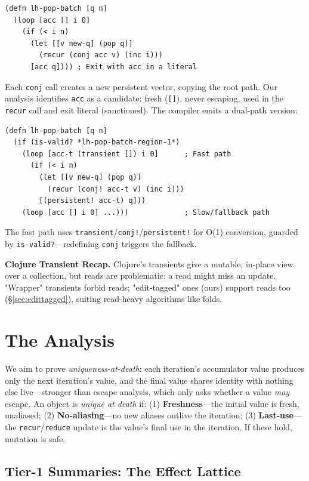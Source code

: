 \documentclass[sigplan,review,anonymous]{acmart}
\begin{document}
\begin{lstlisting}
(defn lh-pop-batch [q n]
  (loop [acc [] i 0]
    (if (< i n)
      (let [[v new-q] (pop q)]
        (recur (conj acc v) (inc i)))
      [acc q]))) ; Exit with acc in a literal
\end{lstlisting}
Each \texttt{conj} call creates a new persistent vector, copying the root path. Our analysis identifies \texttt{acc} as a candidate: fresh (\texttt{[]}), never escaping, used in the \texttt{recur} call and exit literal (sanctioned). The compiler emits a dual-path version:
\begin{lstlisting}
(defn lh-pop-batch [q n]
  (if (is-valid? *lh-pop-batch-region-1*)
    (loop [acc-t (transient []) i 0]      ; Fast path
      (if (< i n)
        (let [[v new-q] (pop q)]
          (recur (conj! acc-t v) (inc i)))
        [(persistent! acc-t) q]))
    (loop [acc [] i 0] ...)))             ; Slow/fallback path
\end{lstlisting}
The fast path uses \texttt{transient}/\texttt{conj!}/\texttt{persistent!} for O(1) conversion, guarded by \texttt{is-valid?}---redefining \texttt{conj} triggers the fallback.

\textbf{Clojure Transient Recap.} Clojure's transients give a mutable, in-place view over a collection, but reads are problematic: a read might miss an update. "Wrapper" transients forbid reads; "edit-tagged" ones (ours) support reads too (§\ref{sec:edittagged}), suiting read-heavy algorithms like folds.

\section{The Analysis}
\label{sec:analysis}

We aim to prove \emph{uniqueness-at-death}: each iteration's accumulator value produces only the next iteration's value, and the final value shares identity with nothing else live---stronger than escape analysis, which only asks whether a value \emph{may} escape. An object is \emph{unique at death} if: (1) \textbf{Freshness}---the initial value is fresh, unaliased; (2) \textbf{No-aliasing}---no new aliases outlive the iteration; (3) \textbf{Last-use}---the \texttt{recur}/\texttt{reduce} update is the value's final use in the iteration. If these hold, mutation is safe.

\subsection{Tier-1 Summaries: The Effect Lattice}
\label{sec:tier1}
\end{document}
